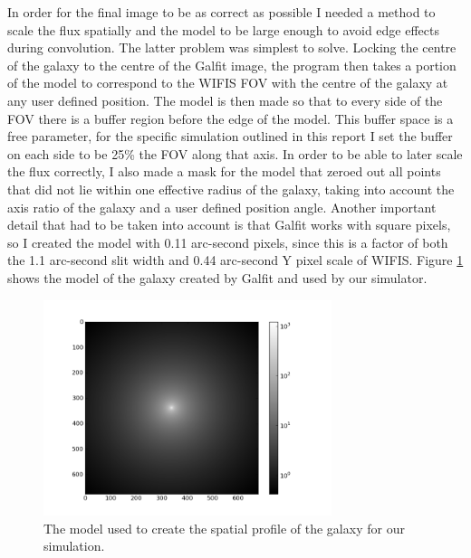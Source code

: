 \documentclass[11pt,twoside]{article}
\begin{document}
In order for the final image to be as correct as possible I needed a method to scale the flux spatially and the model to be large enough to avoid edge effects during convolution. The latter problem was simplest to solve. Locking the centre of the galaxy to the centre of the Galfit image, the program then takes a portion of the model to correspond to the WIFIS FOV with the centre of the galaxy at any user defined position. The model is then made so that to every side of the FOV there is a buffer region before the edge of the model. This buffer space is a free parameter, for the specific simulation outlined in this report I set the buffer on each side to be 25\% the FOV along that axis. In order to be able to later scale the flux correctly, I also made a mask for the model that zeroed out all points that did not lie within one effective radius of the galaxy, taking into account the axis ratio of the galaxy and a user defined position angle. Another important detail that had to be taken into account is that Galfit works with square pixels, so I created the model with 0.11 arc-second pixels, since this is a factor of both the 1.1 arc-second slit width and 0.44 arc-second Y pixel scale of WIFIS. Figure \ref{model} shows the model of the galaxy created by Galfit and used by our simulator. 


\begin{figure}[htbp]
\centering
\includegraphics[width=0.75\textwidth]{galfit_model}
\caption{The model used to create the spatial profile of the galaxy for our simulation.}
\label{model}
\end{figure}
\end{document}
